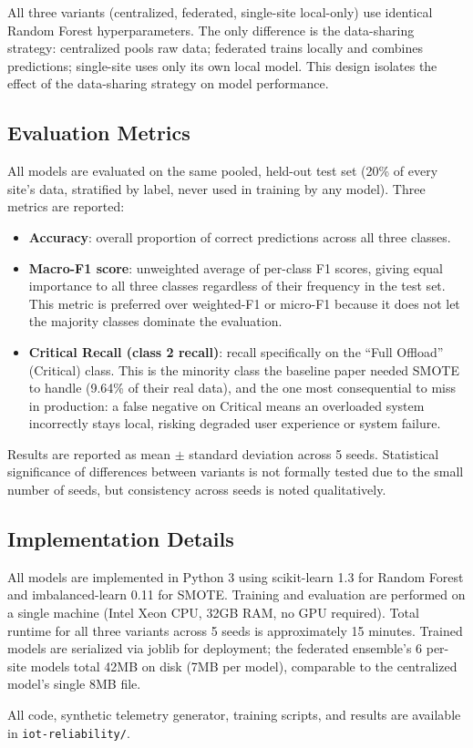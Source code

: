 All three variants (centralized, federated, single-site local-only) use identical Random Forest hyperparameters. The only difference is the data-sharing strategy: centralized pools raw data; federated trains locally and combines predictions; single-site uses only its own local model. This design isolates the effect of the data-sharing strategy on model performance.

\subsection{Evaluation Metrics}
\label{subsec:metrics}

All models are evaluated on the same pooled, held-out test set (20\% of every site's data, stratified by label, never used in training by any model). Three metrics are reported:

\begin{itemize}
  \item \textbf{Accuracy}: overall proportion of correct predictions across all three classes.
  \item \textbf{Macro-F1 score}: unweighted average of per-class F1 scores, giving equal importance to all three classes regardless of their frequency in the test set. This metric is preferred over weighted-F1 or micro-F1 because it does not let the majority classes dominate the evaluation.
  \item \textbf{Critical Recall (class 2 recall)}: recall specifically on the ``Full Offload'' (Critical) class. This is the minority class the baseline paper needed SMOTE to handle (9.64\% of their real data), and the one most consequential to miss in production: a false negative on Critical means an overloaded system incorrectly stays local, risking degraded user experience or system failure.
\end{itemize}

Results are reported as mean $\pm$ standard deviation across 5 seeds. Statistical significance of differences between variants is not formally tested due to the small number of seeds, but consistency across seeds is noted qualitatively.

\subsection{Implementation Details}
\label{subsec:implementation}

All models are implemented in Python 3 using scikit-learn 1.3 for Random Forest and imbalanced-learn 0.11 for SMOTE. Training and evaluation are performed on a single machine (Intel Xeon CPU, 32GB RAM, no GPU required). Total runtime for all three variants across 5 seeds is approximately 15 minutes. Trained models are serialized via joblib for deployment; the federated ensemble's 6 per-site models total 42MB on disk (7MB per model), comparable to the centralized model's single 8MB file.

All code, synthetic telemetry generator, training scripts, and results are available in \texttt{iot-reliability/}.
